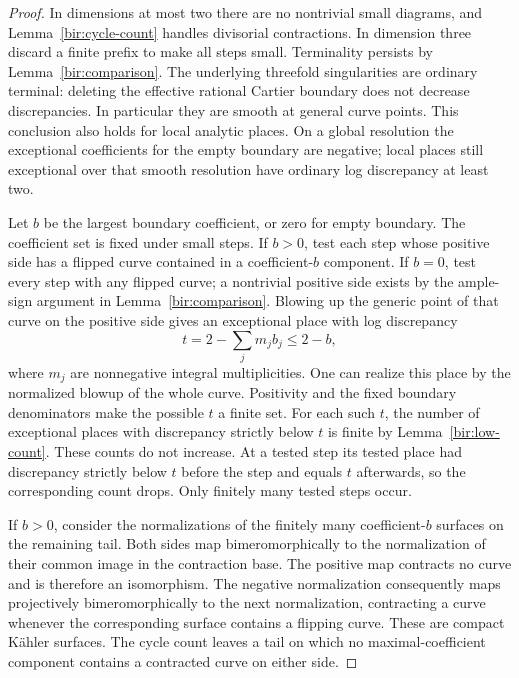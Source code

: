 \documentclass[11pt,letterpaper]{article}
\theoremstyle{definition}
\theoremstyle{remark}
\begin{document}
\begin{proof}
In dimensions at most two there are no nontrivial small diagrams, and
Lemma~\ref{bir:cycle-count} handles divisorial contractions.  In
dimension three discard a finite prefix to make all steps small.
Terminality persists by Lemma~\ref{bir:comparison}.  The underlying
threefold singularities are ordinary terminal: deleting the effective
rational Cartier boundary does not decrease discrepancies.  In
particular they are smooth at general curve points.  This conclusion
also holds for local analytic places.  On a global resolution the
exceptional coefficients for the empty boundary are negative; local
places still exceptional over that smooth resolution have ordinary
log discrepancy at least two.

Let $b$ be the largest boundary coefficient, or zero for empty
boundary.  The coefficient set is fixed under small steps.  If $b>0$,
test each step whose positive side has a flipped curve contained in
a coefficient-$b$ component.  If $b=0$, test every step with any
flipped curve; a nontrivial positive side exists by the ample-sign
argument in Lemma~\ref{bir:comparison}.  Blowing up the generic point
of that curve on the positive side gives an exceptional place with
log discrepancy
\begin{equation}
 t=2-\sum_j m_jb_j\leq2-b,
 \label{bir:terminal-test}
\end{equation}
where $m_j$ are nonnegative integral multiplicities.  One can realize
this place by the normalized blowup of the whole curve.  Positivity
and the fixed boundary denominators make the possible $t$ a finite
set.  For each such $t$, the number of exceptional places with
discrepancy strictly below $t$ is finite by
Lemma~\ref{bir:low-count}.  These counts do not increase.  At a tested
step its tested place had discrepancy strictly below $t$ before the
step and equals $t$ afterwards, so the corresponding count drops.
Only finitely many tested steps occur.

If $b>0$, consider the normalizations of the finitely many
coefficient-$b$ surfaces on the remaining tail.  Both sides map
bimeromorphically to the normalization of their common image in the
contraction base.  The positive map contracts no curve and is
therefore an isomorphism.  The negative normalization consequently
maps projectively bimeromorphically to the next normalization,
contracting a curve whenever the corresponding surface contains a
flipping curve.  These are compact K\"ahler surfaces.  The cycle
count leaves a tail on which no maximal-coefficient component
contains a contracted curve on either side.


\end{proof}
\end{document}
